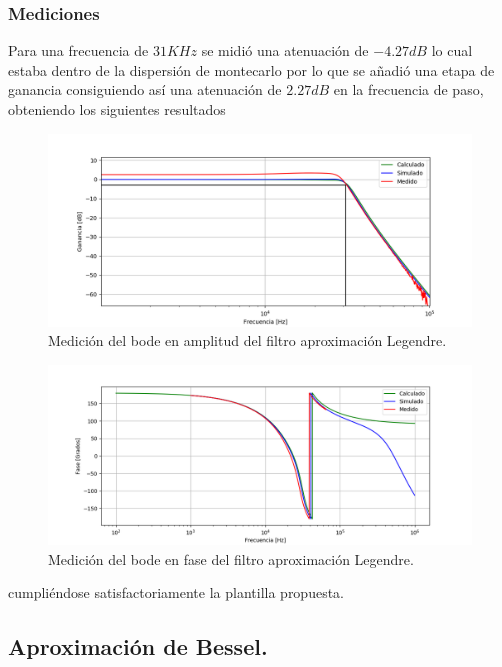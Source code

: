 \subsubsection{Mediciones}

Para una frecuencia de $31KHz$ se midió una atenuación de $-4.27dB$ lo cual estaba dentro de la dispersión de montecarlo por lo que se añadió una etapa de ganancia consiguiendo así una atenuación de $2.27dB$ en la frecuencia de paso, obteniendo los siguientes resultados

\begin{figure}[H]
\centering
	\centering
	\includegraphics[width=\textwidth]{Imagenes-Ej1/legendre_hs_med.png}
	\caption{Medición del bode en amplitud del filtro aproximación Legendre.}
	\label{leg_bodeamp_med}
\end{figure}
\begin{figure}[H]
\centering
	\centering
	\includegraphics[width=\textwidth]{Imagenes-Ej1/legendre_hspha_med.png}
	\caption{Medición del bode en fase del filtro aproximación Legendre.}
	\label{leg_bodepha_med}
\end{figure}

cumpliéndose satisfactoriamente la plantilla propuesta.

\subsection{Aproximación de Bessel.}

